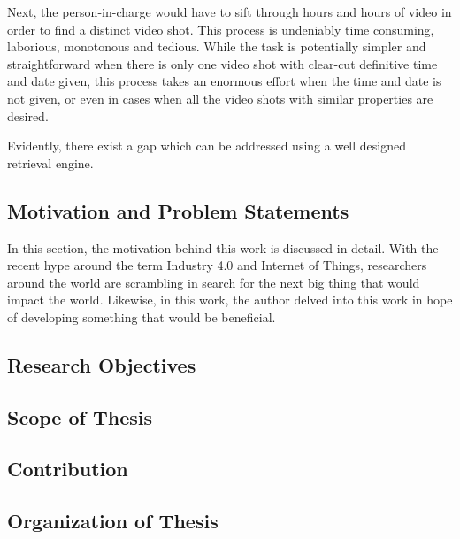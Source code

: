 Next, the person-in-charge would have to sift through hours and hours of video in order to find a distinct video shot. This process is undeniably time consuming, laborious, monotonous and tedious. While the task is potentially simpler and straightforward when there is only one video shot with clear-cut definitive time and date given, this process takes an enormous effort when the time and date is not given, or even in cases when all the video shots with similar properties are desired. 

Evidently, there exist a gap which can be addressed using a well designed retrieval engine.


\subsection{Motivation and Problem Statements}

In this section, the motivation behind this work is discussed in detail. With the recent hype around the term Industry 4.0 and Internet of Things, researchers around the world are scrambling in search for the next big thing that would impact the world. Likewise, in this work, the author delved into this work in hope of developing something that would be beneficial.




\subsection{Research Objectives}




\subsection{Scope of Thesis}
\label{subsec:scope}



\subsection{Contribution}

\subsection{Organization of Thesis}